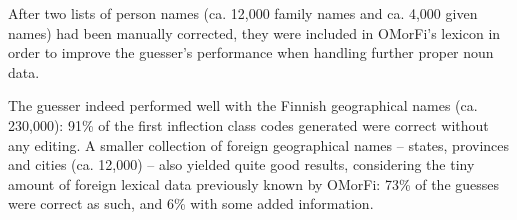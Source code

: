 \documentclass{llncs}
\begin{document}
%
% 

After two lists of person names (ca. 12,000 family names and ca. 4,000 given names) 
had been manually corrected, they were included in OMorFi's lexicon in order to improve the guesser's performance
when handling further proper noun data. 


The guesser indeed performed well with the Finnish geographical
names (ca. 230,000): 91\% of the first inflection class codes generated were
correct without any editing. A smaller collection of foreign
geographical names -- states, provinces and cities (ca. 12,000) --
also yielded quite good results, considering the tiny amount of
foreign lexical data previously known by OMorFi: 73\% of the guesses
were correct as such, and 6\% with some added information.
\end{document}
